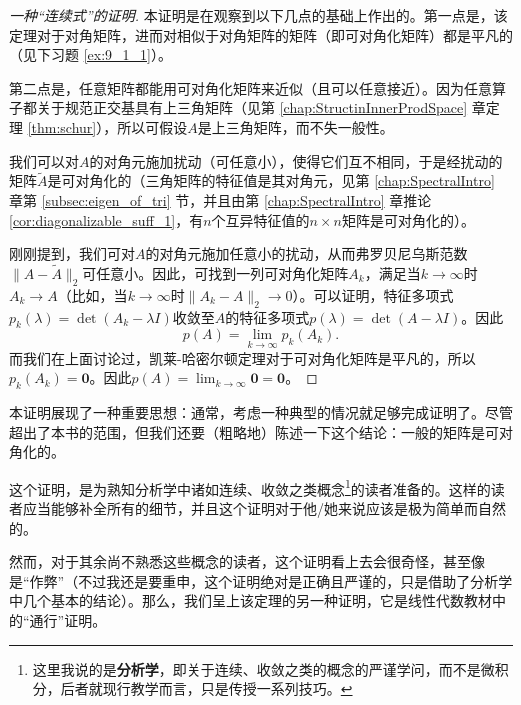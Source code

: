 \begin{proof}[一种“连续式”的证明]
    本证明是在观察到以下几点的基础上作出的。第一点是，该定理对于对角矩阵，进而对相似于对角矩阵的矩阵（即可对角化矩阵）都是平凡的（见下习题 \ref{ex:9_1_1}）。

    第二点是，任意矩阵都能用可对角化矩阵来近似（且可以任意接近）。因为任意算子都关于规范正交基具有上三角矩阵（见第 \ref{chap:StructinInnerProdSpace} 章定理 \ref{thm:schur}），所以可假设$A$是上三角矩阵，而不失一般性。

    我们可以对$A$的对角元施加扰动（可任意小），使得它们互不相同，于是经扰动的矩阵$\widetilde{A}$是可对角化的（三角矩阵的特征值是其对角元，见第 \ref{chap:SpectralIntro} 章第 \ref{subsec:eigen_of_tri} 节，并且由第 \ref{chap:SpectralIntro} 章推论 \ref{cor:diagonalizable_suff_1}，有$n$个互异特征值的$n\times n$矩阵是可对角化的）。

    刚刚提到，我们可对$A$的对角元施加任意小的扰动，从而弗罗贝尼乌斯范数$\|A-\widetilde{A}\|_2$可任意小。因此，可找到一列可对角化矩阵$A_k$，满足当$k\to \infty$时$A_k\to A$（比如，当$k\to \infty$时$\|A_k-A\|_2\to 0$）。可以证明，特征多项式$p_k(\lambda)=\det (A_k-\lambda I)$收敛至$A$的特征多项式$p(\lambda)=\det (A-\lambda I)$。因此\[p(A)=\lim_{k\to \infty}p_k(A_k).\]
    而我们在上面讨论过，凯莱-哈密尔顿定理对于可对角化矩阵是平凡的，所以$p_k(A_k)=\mathbf{0}$。因此$p(A)=\lim_{k\to \infty}\mathbf{0}=\mathbf{0}$。
\end{proof}

本证明展现了一种重要思想：通常，考虑一种典型的情况就足够完成证明了。尽管超出了本书的范围，但我们还要（粗略地）陈述一下这个结论：一般的矩阵是可对角化的。

这个证明，是为熟知分析学中诸如连续、收敛之类概念\footnote{这里我说的是{\bf 分析学}，即关于连续、收敛之类的概念的严谨学问，而不是微积分，后者就现行教学而言，只是传授一系列技巧。}的读者准备的。这样的读者应当能够补全所有的细节，并且这个证明对于他/她来说应该是极为简单而自然的。

然而，对于其余尚不熟悉这些概念的读者，这个证明看上去会很奇怪，甚至像是“作弊”（不过我还是要重申，这个证明绝对是正确且严谨的，只是借助了分析学中几个基本的结论）。那么，我们呈上该定理的另一种证明，它是线性代数教材中的“通行”证明。

